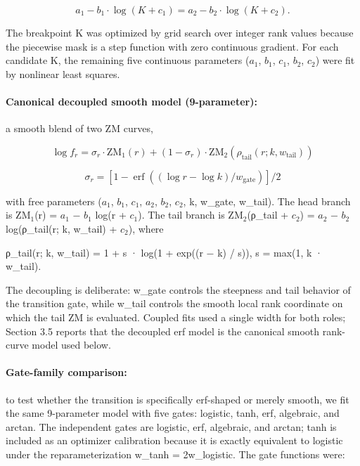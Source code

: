 \documentclass[11pt]{article}
\begin{document}
\begin{equation}
\tag{7}\label{eq:continuity}
a_1 - b_1 \cdot \log(K + c_1) = a_2 - b_2 \cdot \log(K + c_2).
\end{equation}

The breakpoint K was optimized by grid search over integer rank values because the piecewise mask is a step function with zero continuous gradient. For each candidate K, the remaining five continuous parameters ($a_1$, $b_1$, $c_1$, $b_2$, $c_2$) were fit by nonlinear least squares.

\paragraph{Canonical decoupled smooth model (9-parameter):} a smooth blend of two ZM curves,

\begin{equation}
\tag{8}\label{eq:sigmoid}
\log f_r = \sigma_r \cdot \mathrm{ZM}_1(r) + (1 - \sigma_r) \cdot \mathrm{ZM}_2(\rho_{\mathrm{tail}}(r; k, w_{\mathrm{tail}}))
\end{equation}

\begin{equation}
\tag{9}\label{eq:sigmoid-gate}
\sigma_r = [1-\operatorname{erf}((\log r-\log k)/w_{\mathrm{gate}})]/2
\end{equation}

with free parameters ($a_1$, $b_1$, $c_1$, $a_2$, $b_2$, $c_2$, k, w\_gate, w\_tail). The head branch is $\mathrm{ZM}_1$(r) = $a_1$ − $b_1$ log(r + $c_1$). The tail branch is $\mathrm{ZM}_2$(ρ\_tail + $c_2$) = $a_2$ − $b_2$ log(ρ\_tail(r; k, w\_tail) + $c_2$), where

ρ\_tail(r; k, w\_tail) = 1 + s · log(1 + exp((r − k) / s)),   s = max(1, k · w\_tail).

The decoupling is deliberate: w\_gate controls the steepness and tail behavior of the transition gate, while w\_tail controls the smooth local rank coordinate on which the tail ZM is evaluated. Coupled fits used a single width for both roles; Section 3.5 reports that the decoupled erf model is the canonical smooth rank-curve model used below.

\paragraph{Gate-family comparison:} to test whether the transition is specifically erf-shaped or merely smooth, we fit the same 9-parameter model with five gates: logistic, tanh, erf, algebraic, and arctan. The independent gates are logistic, erf, algebraic, and arctan; tanh is included as an optimizer calibration because it is exactly equivalent to logistic under the reparameterization w\_tanh = 2w\_logistic. The gate functions were:
\end{document}
